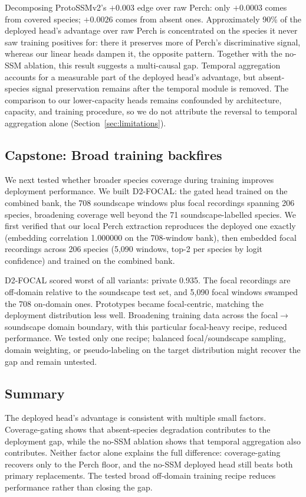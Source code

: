 \documentclass{ceurart}
\begin{document}
Decomposing ProtoSSMv2's $+0.003$ edge over raw Perch:
only $+0.0003$ comes from covered species;
$+0.0026$ comes from absent ones.
Approximately 90\% of the deployed head's advantage over raw Perch is concentrated on the species it never saw training positives for: there it preserves more of Perch's discriminative signal, whereas our linear heads dampen it, the opposite pattern.
Together with the no-SSM ablation, this result suggests a multi-causal gap. Temporal aggregation accounts for a measurable part of the deployed head's advantage, but absent-species signal preservation remains after the temporal module is removed. The comparison to our lower-capacity heads remains confounded by architecture, capacity, and training procedure, so we do not attribute the reversal to temporal aggregation alone (Section~\ref{sec:limitations}).

\subsection{Capstone: Broad training backfires}

We next tested whether broader species coverage during training improves deployment performance.
We built D2-FOCAL: the gated head trained on the combined bank, the 708 soundscape windows plus focal recordings spanning 206 species, broadening coverage well beyond the 71 soundscape-labelled species.
We first verified that our local Perch extraction reproduces the deployed one exactly (embedding correlation 1.000000 on the 708-window bank), then embedded focal recordings across 206 species (5,090 windows, top-2 per species by logit confidence) and trained on the combined bank.

D2-FOCAL scored worst of all variants: private 0.935.
The focal recordings are off-domain relative to the soundscape test set, and 5,090 focal windows swamped the 708 on-domain ones.
Prototypes became focal-centric, matching the deployment distribution less well.
Broadening training data across the focal$\rightarrow$soundscape domain boundary, with this particular focal-heavy recipe, reduced performance. We tested only one recipe; balanced focal/soundscape sampling, domain weighting, or pseudo-labeling on the target distribution might recover the gap and remain untested.

\subsection{Summary}

The deployed head's advantage is consistent with multiple small factors. Coverage-gating shows that absent-species degradation contributes to the deployment gap, while the no-SSM ablation shows that temporal aggregation also contributes. Neither factor alone explains the full difference: coverage-gating recovers only to the Perch floor, and the no-SSM deployed head still beats both primary replacements. The tested broad off-domain training recipe reduces performance rather than closing the gap.
\end{document}

